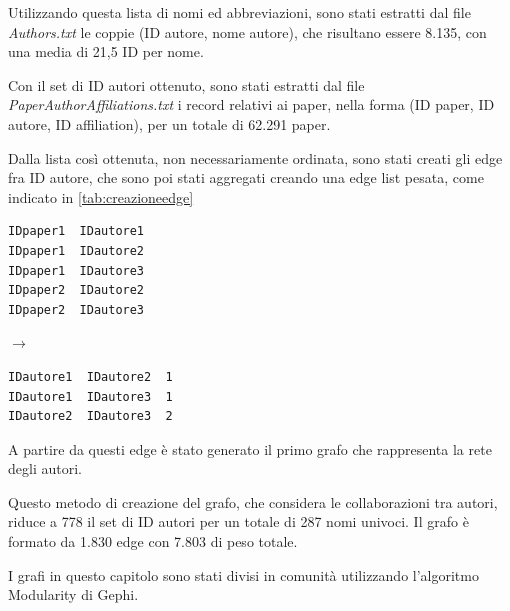 \documentclass[12pt,a4paper,twoside]{report}
\begin{document}
Utilizzando questa lista di nomi ed abbreviazioni, sono stati estratti dal file \textit{Authors.txt}
le coppie (ID autore, nome autore), che risultano essere 8.135, con una media di 21,5 ID per nome.

Con il set di ID autori ottenuto, sono stati estratti dal file \textit{PaperAuthorAffiliations.txt}
i record relativi ai paper, nella forma (ID paper, ID autore, ID affiliation), per un totale di
62.291 paper.

Dalla lista così ottenuta, non necessariamente ordinata, sono stati creati gli edge fra ID autore,
che sono poi stati aggregati creando una edge list pesata, come indicato in \ref{tab:creazioneedge}

\begin{center}

\label{tab:creazioneedge}
\begin{minipage}{0.40\textwidth}
\begin{verbatim}
IDpaper1  IDautore1
IDpaper1  IDautore2
IDpaper1  IDautore3
IDpaper2  IDautore2
IDpaper2  IDautore3
\end{verbatim}
\end{minipage}
\begin{minipage}{0.075\textwidth}
$\rightarrow$
\end{minipage}
\begin{minipage}{0.40\textwidth}
\begin{verbatim}
IDautore1  IDautore2  1
IDautore1  IDautore3  1
IDautore2  IDautore3  2
\end{verbatim}
\end{minipage}
\end{center}
A partire da questi edge è stato generato il primo grafo che rappresenta la rete degli autori.

Questo metodo di creazione del grafo, che considera le collaborazioni tra autori, riduce a 778 il
set di ID autori per un totale di 287 nomi univoci. Il grafo è formato da 1.830 edge con 7.803 di
peso totale.

I grafi in questo capitolo sono stati divisi in comunità utilizzando l'algoritmo Modularity di
Gephi.
\end{document}
